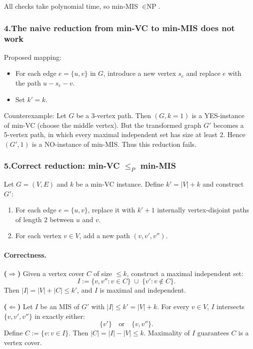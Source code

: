 \documentclass[9pt]{extarticle}
\begin{document}
All checks take polynomial time, so min-MIS $\in\text{NP}$.


\subsubsection*{4.\quad The naive reduction from min-VC to min-MIS does not work}

Proposed mapping:
\begin{itemize}
    \item For each edge $e=\{u,v\}$ in $G$, introduce a new vertex $s_e$ and replace $e$ with the path
          $u - s_e - v$.
    \item Set $k'=k$.
\end{itemize}

Counterexample:  
Let $G$ be a 3-vertex path.  
Then $(G,k=1)$ is a YES-instance of min-VC (choose the middle vertex).  
But the transformed graph $G'$ becomes a 5-vertex path, in which every maximal independent set has size at least $2$.  
Hence $(G',1)$ is a NO-instance of min-MIS.  
Thus this reduction fails.


\subsubsection*{5.\quad Correct reduction: min-VC $\le_P$ min-MIS}

Let $G=(V,E)$ and $k$ be a min-VC instance.  
Define $k' = |V| + k$ and construct $G'$:

\begin{enumerate}
    \item For each edge $e=\{u,v\}$, replace it with $k'+1$ internally vertex-disjoint paths  
          of length $2$ between $u$ and $v$.
    \item For each vertex $v\in V$, add a new path $(v, v', v'')$.
\end{enumerate}

\paragraph{Correctness.}

\textbf{($\Rightarrow$)}  
Given a vertex cover $C$ of size $\le k$, construct a maximal independent set:
\[
I := \{v, v'': v\in C\} \;\cup\; \{v': v\notin C\}.
\]
Then $|I| = |V| + |C| \le k'$, and $I$ is maximal and independent.

\textbf{($\Leftarrow$)}  
Let $I$ be an MIS of $G'$ with $|I|\le k'=|V|+k$.  
For every $v\in V$, $I$ intersects $\{v,v',v''\}$ in exactly either:
\[
\{v'\} \quad \text{or} \quad \{v, v''\}.
\]
Define $C := \{v : v\in I\}$. Then $|C| = |I|-|V| \le k$.  
Maximality of $I$ guarantees $C$ is a vertex cover.
\end{document}

